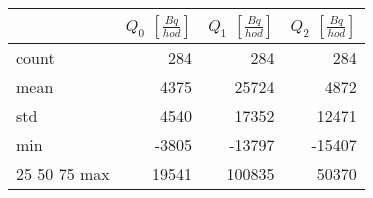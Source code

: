 \begin{tabular}{lrrr}
\toprule
{} &  $Q_0$ $\left[\si{\frac{Bq}{hod}}\right]$ &  $Q_1$ $\left[\si{\frac{Bq}{hod}}\right]$ &  $Q_2$ $\left[\si{\frac{Bq}{hod}}\right]$ \\
\midrule
count &                                       284 &                                       284 &                                       284 \\
mean  &                                      4375 &                                     25724 &                                      4872 \\
std   &                                      4540 &                                     17352 &                                     12471 \\
min   &                                     -3805 &                                    -13797 &                                    -15407 \\
25%
50%
75%
max   &                                     19541 &                                    100835 &                                     50370 \\
\bottomrule
\end{tabular}
